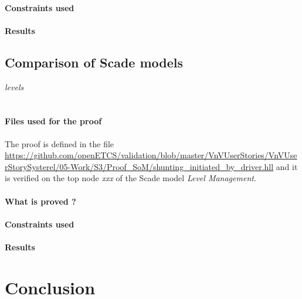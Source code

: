 \documentclass{article}
\begin{document}
\paragraph{Constraints used}


\paragraph{Results}


\subsection{Comparison of Scade models}

\emph{levels}\\
\\

\paragraph{Files used for the proof} The proof is defined in the file \url{https://github.com/openETCS/validation/blob/master/VnVUserStories/VnVUserStorySysterel/05-Work/S3/Proof_SoM/shunting_initiated_by_driver.hll} and it is verified on the top node \emph{xxx} of the Scade model \emph{Level Management}.

\paragraph{What is proved ?}


\paragraph{Constraints used}


\paragraph{Results}


\section{Conclusion}
\end{document}
